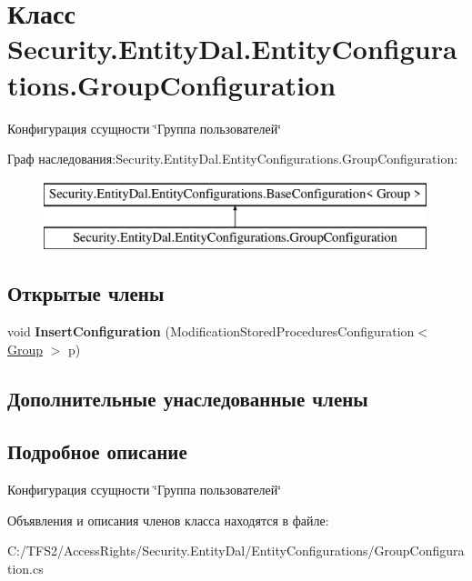 \hypertarget{class_security_1_1_entity_dal_1_1_entity_configurations_1_1_group_configuration}{}\section{Класс Security.\+Entity\+Dal.\+Entity\+Configurations.\+Group\+Configuration}
\label{class_security_1_1_entity_dal_1_1_entity_configurations_1_1_group_configuration}


Конфигурация ссущности \char`\"{}Группа пользователей\char`\"{}  


Граф наследования\+:Security.\+Entity\+Dal.\+Entity\+Configurations.\+Group\+Configuration\+:\begin{figure}[H]
\begin{center}
\leavevmode
\includegraphics[height=2.000000cm]{d5/dec/class_security_1_1_entity_dal_1_1_entity_configurations_1_1_group_configuration}
\end{center}
\end{figure}
\subsection*{Открытые члены}
\begin{DoxyCompactItemize}
\item 
\mbox{\label{class_security_1_1_entity_dal_1_1_entity_configurations_1_1_group_configuration_a4ec64fb718188e3500da80f70523ee26}} 
void {\bfseries Insert\+Configuration} (Modification\+Stored\+Procedures\+Configuration$<$ \hyperlink{class_security_1_1_model_1_1_group}{Group} $>$ p)
\end{DoxyCompactItemize}
\subsection*{Дополнительные унаследованные члены}


\subsection{Подробное описание}
Конфигурация ссущности \char`\"{}Группа пользователей\char`\"{} 



Объявления и описания членов класса находятся в файле\+:\begin{DoxyCompactItemize}
\item 
C\+:/\+T\+F\+S2/\+Access\+Rights/\+Security.\+Entity\+Dal/\+Entity\+Configurations/Group\+Configuration.\+cs\end{DoxyCompactItemize}
